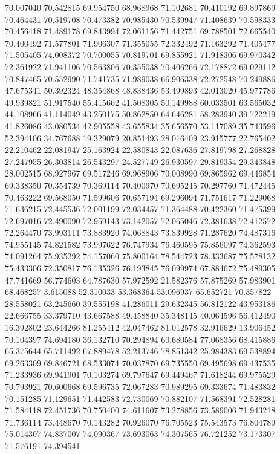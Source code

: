70.007040
70.542815
69.954750
68.968968
71.102681
70.410192
69.897869
70.464431
70.519708
70.473382
70.985430
70.539947
71.408639
70.598333
70.456418
71.489178
69.843994
72.061156
71.442751
69.788501
72.665540
70.400492
71.577801
71.906307
71.355055
72.332492
71.163292
71.405477
71.505405
74.008372
70.700055
70.819701
69.855921
71.918306
69.970342
72.361922
71.941106
70.563806
70.355038
70.406266
72.178872
69.029112
70.847465
70.552990
71.741735
71.989038
66.906338
72.272548
70.249886
47.675341
50.392324
48.354868
48.838436
53.499893
42.013020
45.977786
49.939821
51.917540
55.415662
41.508305
50.149988
60.033501
63.565032
44.108966
41.114049
43.250175
50.862850
64.646281
58.283940
39.722219
41.826086
43.080534
42.905558
43.655834
35.656570
53.117089
35.743596
52.394106
34.767688
19.329079
20.851493
28.016409
23.915777
22.765402
22.210462
22.081947
25.163924
22.580843
22.087636
27.819798
27.268828
27.247955
26.303814
26.543297
24.527749
26.930597
29.819354
29.343848
28.002515
68.927967
69.517246
69.968906
70.008990
69.865962
69.446854
69.338350
70.354739
70.369114
70.400970
70.695245
70.297760
71.472445
70.463222
69.568050
71.599606
70.657194
69.296094
71.751617
71.229068
71.636215
72.445536
72.001199
72.034457
71.364488
70.422360
71.475399
72.697016
72.490090
72.959143
73.142057
72.065046
72.381638
72.412572
72.264470
73.993111
73.883920
74.068843
73.839928
71.287620
74.487316
74.955145
74.821582
73.997622
76.747934
76.460595
75.856097
74.362593
74.091264
75.935292
74.157060
75.800164
78.544723
78.333687
75.578132
75.433306
72.350817
76.135326
76.193845
76.099974
67.884672
75.489305
47.741669
56.774603
64.787630
57.972592
21.582376
57.875269
57.983901
68.468257
3.615088
52.310033
53.368364
53.096937
65.652721
70.357822
28.558021
63.245660
39.555198
41.286011
29.632345
56.812122
43.953186
22.666755
33.379710
43.667588
49.458840
35.348145
40.064596
56.412490
16.392802
23.644266
81.255412
42.047462
81.012578
32.916629
13.906452
70.104397
74.694180
36.132710
70.294894
60.680584
77.068356
68.415886
65.375644
65.711492
67.889478
52.213746
78.851342
25.984383
69.538894
69.263309
69.846721
68.533074
70.037870
69.735550
69.495698
69.437535
71.233936
69.941901
70.103274
69.797647
69.449467
71.618244
69.975529
70.793921
70.600668
69.596735
72.067283
70.989295
69.333674
71.483832
70.151285
71.129651
71.442583
72.730069
70.882107
71.568391
72.528281
71.584118
72.451736
70.750400
74.611607
73.278856
73.589006
71.943218
71.736114
73.448670
70.143282
70.926070
76.705523
75.543573
76.804789
75.014307
74.837007
74.090367
73.693063
74.307565
76.721252
73.173307
71.576191
74.394541
